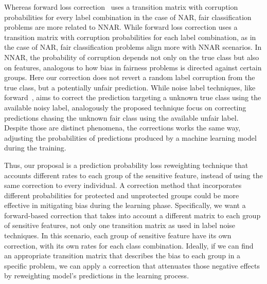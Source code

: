 Whereas forward loss correction~\citep{Patrini2017} uses a transition matrix with corruption probabilities for every label combination in the case of NAR, fair classification problems are more related to NNAR. While forward loss correction uses a transition matrix with corruption probabilities for each label combination, as in the case of NAR, fair classification problems align more with NNAR scenarios. In NNAR, the probability of corruption depends not only on the true class but also on features, analogous to how bias in fairness problems is directed against certain groups. Here our correction does not revert a random label corruption from the true class, but a potentially unfair prediction. While noise label techniques, like forward~\citep{Patrini2017}, aims to correct the prediction targeting a unknown true class using the available noisy label, analogously the proposed technique focus on correcting predictions chasing the unknown fair class using the available unfair label. Despite those are distinct phenomena, the corrections works the same way, adjusting the probabilities of predictions produced by a machine learning model during the training. 

Thus, our proposal is a prediction probability loss reweighting technique that accounts different rates to each group of the sensitive feature, instead of using the same correction to every individual. A correction method that incorporates different probabilities for protected and unprotected groups could be more effective in mitigating bias during the learning phase. Specifically, we want a forward-based correction that takes into account a different matrix to each group of sensitive features, not only one transition matrix as used in label noise techniques. In this scenario, each group of sensitive feature have its own correction, with its own rates for each class combination. Ideally, if we can find an appropriate transition matrix that describes the bias to each group in a specific problem, we can apply a correction that attenuates those negative effects by reweighting model's predictions in the learning process.

